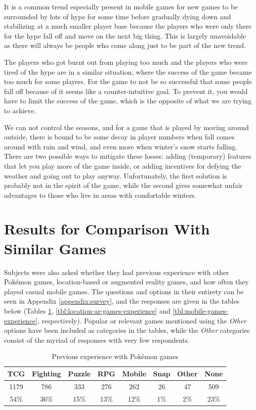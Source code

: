 It is a common trend especially present in mobile games for new games to be surrounded by lots of hype for some time before gradually dying down and stabilizing at a much smaller player base because the players who were only there for the hype fall off and move on the next big thing. This is largely unavoidable as there will always be people who come along just to be part of the new trend.

The players who got burnt out from playing too much and the players who were tired of the hype are in a similar situation, where the success of the game became too much for some players. For the game to not be so successful that some people fall off because of it seems like a counter-intuitive goal. To prevent it, you would have to limit the success of the game, which is the opposite of what we are trying to achieve.

We can not control the seasons, and for a game that is played by moving around outside, there is bound to be some decay in player numbers when fall comes around with rain and wind, and even more when winter's snow starts falling. There are two possible ways to mitigate these losses: adding (temporary) features that let you play more of the game inside, or adding incentives for defying the weather and going out to play anyway. Unfortunately, the first solution is probably not in the spirit of the game, while the second gives somewhat unfair advantages to those who live in areas with comfortable winters.

\section{Results for Comparison With Similar Games}
Subjects were also asked whether they had previous experience with other Pokémon games, location-based or augmented reality games, and how often they played casual mobile games. The questions and options in their entirety can be seen in Appendix \ref{appendix:survey}, and the responses are given in the tables below (Tables \ref{tbl:pokemon-games-experience}, \ref{tbl:location-ar-games-experience} and \ref{tbl:mobile-games-experience}, respectively). Popular or relevant games mentioned using the \emph{Other} options have been included as categories in the tables, while the \emph{Other} categories consist of the myriad of responses with very few respondents.

\begin{table}[h]
	\centering
	\caption{Previous experience with Pokémon games}
	\label{tbl:pokemon-games-experience}
	\begin{tabular}{|c|c|c|c|c|c|c|c|}
		\hline
		\textbf{TCG} & \textbf{Fighting} & \textbf{Puzzle} & \textbf{RPG} & \textbf{Mobile} & \textbf{Snap} & \textbf{Other} & \textbf{None}\\
		\hline\hline
		1179	& 786	& 333	& 276	& 262	& 26	& 47	& 509\\
		54\%	& 36\%	& 15\%	& 13\%	& 12\%	& 1\%	& 2\%	& 23\%\\\hline
	\end{tabular}
\end{table}

